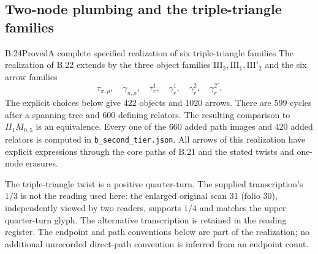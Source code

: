 \subsection{Two-node plumbing and the triple-triangle families}

\begin{result}{B.24}{Proved}{A complete specified realization of six triple-triangle families}
The realization of B.22 extends by the three object families
$\mathrm{III}_2,\mathrm{III}_1,\mathrm{III}'_2$ and the six
arrow families
\[
 \tau_{\pi,\rho},\quad\gamma_{\pi,\rho},\quad
 \tau_r^1,\quad\gamma_r^1,\quad
 \gamma_r^2,\quad\gamma_r^{2'}.
\]
The explicit choices below give $422$ objects and $1020$ arrows.
There are $599$ cycles after a spanning tree and $600$ defining
relators.  The resulting comparison to $\Pi_1M_{0,5}$ is an
equivalence.  Every one of the $660$ added path images and
$420$ added relators is computed in
\texttt{b\_second\_tier.json}.  All arrows of this realization
have explicit expressions through the core paths of B.21 and
the stated twists and one-node erasures.

The triple-triangle twist is a positive quarter-turn.  The
supplied transcription's $1/3$ is not the reading used here:
the enlarged original scan 31 (folio 30), independently viewed
by two readers, supports $1/4$ and matches the upper quarter-turn
glyph.  The alternative transcription is retained in the reading
register.  The endpoint and path conventions below are part of
the realization; no additional unrecorded direct-path convention
is inferred from an endpoint count.
\end{result}
